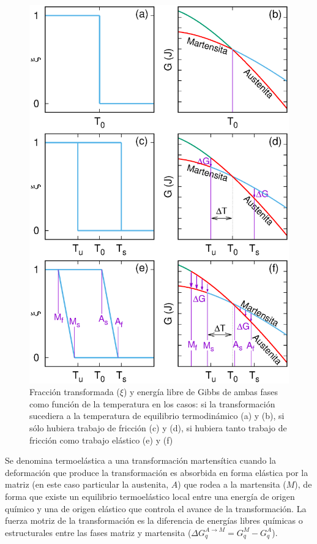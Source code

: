 \documentclass[12pt]{article}
\theoremstyle{definition}
\theoremstyle{remark}
\begin{document}
\begin{figure}
	\centering
	\includegraphics[scale=0.7]{img/Termo.eps}
	\caption{Fracción transformada ($\xi$) y energía libre de Gibbs de ambas fases como función de la temperatura en los casos: si la transformación sucediera a la temperatura de equilibrio termodinámico (a) y (b), si sólo hubiera trabajo de fricción (c) y (d), si hubiera tanto trabajo de fricción como trabajo elástico (e) y (f)} 
	\label{Gibbs}
\end{figure}

Se denomina termoelástica a una transformación martensítica cuando la deformación que produce la transformación es absorbida en forma elástica por la matriz (en este caso particular la austenita, $A$) que rodea a la martensita ($M$), de forma que existe un equilibrio termoelástico local entre una energía de origen químico y una de origen elástico que controla el avance de la transformación. La fuerza motriz de la transformación es la diferencia de energías libres químicas o estructurales entre las fases matriz y martensita ($\Delta G^{A \rightarrow M}_q = G^M_q - G^A_q$).
\end{document}
